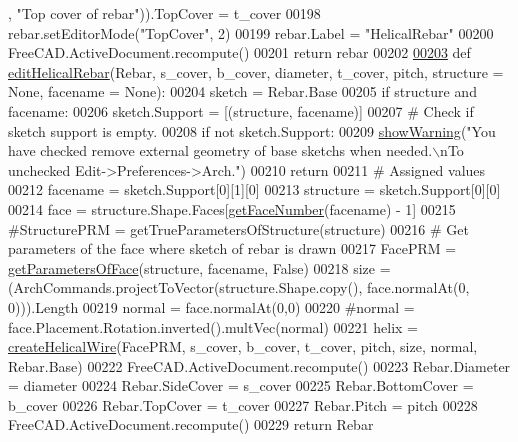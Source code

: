 \begin{DoxyCode}
      , \textcolor{stringliteral}{"Top cover of rebar"})).TopCover = t\_cover
00198     rebar.setEditorMode(\textcolor{stringliteral}{"TopCover"}, 2)
00199     rebar.Label = \textcolor{stringliteral}{"HelicalRebar"}
00200     FreeCAD.ActiveDocument.recompute()
00201     \textcolor{keywordflow}{return} rebar
00202 
\hypertarget{HelicalRebar_8py_source.tex_l00203}{}\hyperlink{namespaceHelicalRebar_aea0d3838b1b171f801acf1046d111c8b}{00203} \textcolor{keyword}{def }\hyperlink{namespaceHelicalRebar_aea0d3838b1b171f801acf1046d111c8b}{editHelicalRebar}(Rebar, s\_cover, b\_cover, diameter, t\_cover, pitch, structure = None, 
      facename = None):
00204     sketch = Rebar.Base
00205     \textcolor{keywordflow}{if} structure \textcolor{keywordflow}{and} facename:
00206         sketch.Support = [(structure, facename)]
00207     \textcolor{comment}{# Check if sketch support is empty.}
00208     \textcolor{keywordflow}{if} \textcolor{keywordflow}{not} sketch.Support:
00209         \hyperlink{namespaceRebarfunc_a2278a0602d46a62953af1fcf2e574a94}{showWarning}(\textcolor{stringliteral}{"You have checked remove external geometry of base sketchs when needed.\(\backslash\)nTo
       unchecked Edit->Preferences->Arch."})
00210         \textcolor{keywordflow}{return}
00211     \textcolor{comment}{# Assigned values}
00212     facename = sketch.Support[0][1][0]
00213     structure = sketch.Support[0][0]
00214     face = structure.Shape.Faces[\hyperlink{namespaceRebarfunc_a3885b3b63e3a41508ac79bc7550cf301}{getFaceNumber}(facename) - 1]
00215     \textcolor{comment}{#StructurePRM = getTrueParametersOfStructure(structure)}
00216     \textcolor{comment}{# Get parameters of the face where sketch of rebar is drawn}
00217     FacePRM = \hyperlink{namespaceRebarfunc_a92122b3d7cedd3d47bb63380a5ac4d08}{getParametersOfFace}(structure, facename, \textcolor{keyword}{False})
00218     size = (ArchCommands.projectToVector(structure.Shape.copy(), face.normalAt(0, 0))).Length
00219     normal = face.normalAt(0,0)
00220     \textcolor{comment}{#normal = face.Placement.Rotation.inverted().multVec(normal)}
00221     helix = \hyperlink{namespaceHelicalRebar_a1a2b3ce39b904ab0c3892ed0965d2844}{createHelicalWire}(FacePRM, s\_cover, b\_cover, t\_cover, pitch, size, normal, 
      Rebar.Base)
00222     FreeCAD.ActiveDocument.recompute()
00223     Rebar.Diameter = diameter
00224     Rebar.SideCover = s\_cover
00225     Rebar.BottomCover = b\_cover
00226     Rebar.TopCover = t\_cover
00227     Rebar.Pitch = pitch
00228     FreeCAD.ActiveDocument.recompute()
00229     \textcolor{keywordflow}{return} Rebar

\end{DoxyCode}
